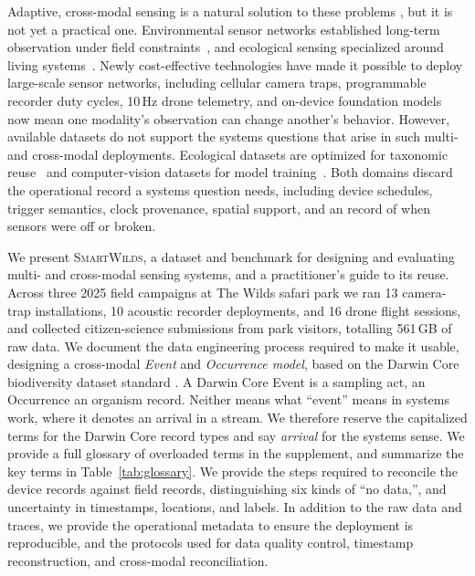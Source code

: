 \documentclass[sigconf]{acmart}
\newcommand{\smartwilds}{\textsc{SmartWilds}\xspace}
\begin{document}
Adaptive, cross-modal sensing is a natural solution to these problems \cite{pollock2026roam}, but it is not yet a practical one.
Environmental sensor networks established long-term observation under field constraints~\cite{metzger2019neon,staccone2021neon}, and ecological sensing specialized around living systems~\cite{lahozmonfort2021monitoring}.
Newly cost-effective technologies have made it possible to deploy large-scale sensor networks, including cellular camera traps,
programmable recorder duty cycles, 10\,Hz drone telemetry, and
on-device foundation models now mean one modality's observation can
change another's behavior. 
However, available datasets do not support the systems questions that arise in such multi- and cross-modal deployments.
Ecological datasets are optimized for taxonomic reuse~\cite{wieczorek2012darwincore,ahumada2020wildlifeinsights} and
computer-vision datasets for model training~\cite{liang2021multibench}.
Both domains discard the operational record a systems question needs, including device
schedules, trigger semantics, clock provenance, spatial support, and an
record of when sensors were off or broken.  

We present \smartwilds, a dataset and benchmark for designing and evaluating multi- and cross-modal sensing systems, and a practitioner's guide to its reuse.
Across three 2025 field campaigns at The Wilds safari park we ran 13 camera-trap installations, 10 acoustic recorder deployments, and 16 drone flight sessions, and collected
citizen-science submissions from park visitors, totalling 561\,GB of raw data.
We document the data engineering process required to make it usable, designing a cross-modal \textit{Event} and \textit{Occurrence model}, based on the Darwin Core biodiversity dataset standard \cite{wieczorek2012darwincore,tdwgDarwinCore}.
A Darwin Core Event is a sampling act, an Occurrence an organism record. 
Neither means what ``event'' means in systems work, where it denotes an arrival in a stream. 
We therefore reserve the capitalized terms for the Darwin Core
record types and say \emph{arrival} for the systems sense.
We provide a full glossary of overloaded terms in the supplement, and summarize the key terms in Table~\ref{tab:glossary}.
We provide the steps required to reconcile the device records against field records, distinguishing six kinds of ``no data,'', and uncertainty in timestamps, locations, and labels.
In addition to the raw data and traces, we provide the operational metadata to ensure the deployment is reproducible, and the protocols used for data quality control, timestamp reconstruction, and cross-modal reconciliation.
%
\end{document}
